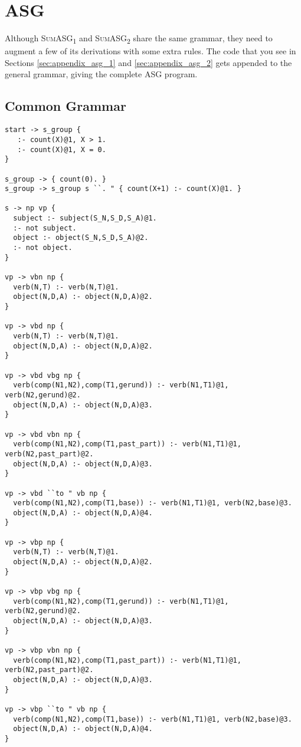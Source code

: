 \chapter{ASG}
\label{appendix:asg}

Although \textsc{SumASG\textsubscript{1}} and \textsc{SumASG\textsubscript{2}} share the same grammar, they need to augment a few of its derivations with some extra rules. The code that you see in Sections \ref{sec:appendix_asg_1} and \ref{sec:appendix_asg_2} gets appended to the general grammar, giving the complete ASG program.

\section{Common Grammar}

\begin{lstlisting}
start -> s_group {
   :- count(X)@1, X > 1.
   :- count(X)@1, X = 0.
}

s_group -> { count(0). }
s_group -> s_group s ``. " { count(X+1) :- count(X)@1. }

s -> np vp {
  subject :- subject(S_N,S_D,S_A)@1.
  :- not subject.
  object :- object(S_N,S_D,S_A)@2.
  :- not object.
}

vp -> vbn np {
  verb(N,T) :- verb(N,T)@1.
  object(N,D,A) :- object(N,D,A)@2.
}

vp -> vbd np {
  verb(N,T) :- verb(N,T)@1.
  object(N,D,A) :- object(N,D,A)@2.
}

vp -> vbd vbg np {
  verb(comp(N1,N2),comp(T1,gerund)) :- verb(N1,T1)@1, verb(N2,gerund)@2.
  object(N,D,A) :- object(N,D,A)@3.
}

vp -> vbd vbn np {
  verb(comp(N1,N2),comp(T1,past_part)) :- verb(N1,T1)@1, verb(N2,past_part)@2.
  object(N,D,A) :- object(N,D,A)@3.
}

vp -> vbd ``to " vb np {
  verb(comp(N1,N2),comp(T1,base)) :- verb(N1,T1)@1, verb(N2,base)@3.
  object(N,D,A) :- object(N,D,A)@4.
}

vp -> vbp np {
  verb(N,T) :- verb(N,T)@1.
  object(N,D,A) :- object(N,D,A)@2.
}

vp -> vbp vbg np {
  verb(comp(N1,N2),comp(T1,gerund)) :- verb(N1,T1)@1, verb(N2,gerund)@2.
  object(N,D,A) :- object(N,D,A)@3.
}

vp -> vbp vbn np {
  verb(comp(N1,N2),comp(T1,past_part)) :- verb(N1,T1)@1, verb(N2,past_part)@2.
  object(N,D,A) :- object(N,D,A)@3.
}

vp -> vbp ``to " vb np {
  verb(comp(N1,N2),comp(T1,base)) :- verb(N1,T1)@1, verb(N2,base)@3.
  object(N,D,A) :- object(N,D,A)@4.
}


\end{lstlisting}
